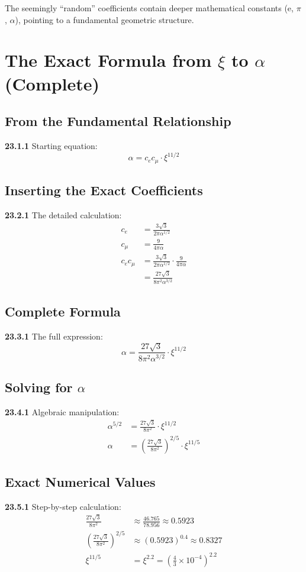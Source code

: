 The seemingly ``random'' coefficients contain deeper mathematical constants (e, $\pi$, $\alpha$), pointing to a fundamental geometric structure.
\section{The Exact Formula from $\xi$ to $\alpha$ (Complete)}

\subsection{From the Fundamental Relationship}
\noindent \textbf{23.1.1} Starting equation:
\begin{equation}
	\alpha = c_e c_\mu \cdot \xi^{11/2}
\end{equation}

\subsection{Inserting the Exact Coefficients}
\noindent \textbf{23.2.1} The detailed calculation:
\begin{align}
	c_e &= \frac{3\sqrt{3}}{2\pi\alpha^{1/2}} \\
	c_\mu &= \frac{9}{4\pi\alpha} \\
	c_e c_\mu &= \frac{3\sqrt{3}}{2\pi\alpha^{1/2}} \cdot \frac{9}{4\pi\alpha} \\
	&= \frac{27\sqrt{3}}{8\pi^2\alpha^{3/2}}
\end{align}

\subsection{Complete Formula}
\noindent \textbf{23.3.1} The full expression:
\begin{equation}
	\alpha = \frac{27\sqrt{3}}{8\pi^2\alpha^{3/2}} \cdot \xi^{11/2}
\end{equation}

\subsection{Solving for $\alpha$}
\noindent \textbf{23.4.1} Algebraic manipulation:
\begin{align}
	\alpha^{5/2} &= \frac{27\sqrt{3}}{8\pi^2} \cdot \xi^{11/2} \\
	\alpha &= \left(\frac{27\sqrt{3}}{8\pi^2}\right)^{2/5} \cdot \xi^{11/5}
\end{align}

\subsection{Exact Numerical Values}
\noindent \textbf{23.5.1} Step-by-step calculation:
\begin{align}
	\frac{27\sqrt{3}}{8\pi^2} &\approx \frac{46.765}{78.956} \approx 0.5923 \\
	\left(\frac{27\sqrt{3}}{8\pi^2}\right)^{2/5} &\approx (0.5923)^{0.4} \approx 0.8327 \\
	\xi^{11/5} &= \xi^{2.2} = \left(\frac{4}{3} \times 10^{-4}\right)^{2.2}
\end{align}

